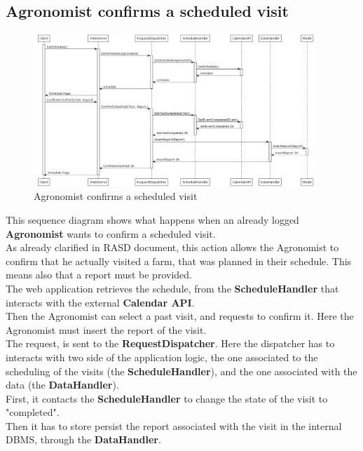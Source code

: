 \documentclass[10pt]{report}
\begin{document}
\subsection{Agronomist confirms a scheduled visit}
\begin{figure}[H]
    \centering
    \includegraphics[width=400px]{SequenceDiagram/Agronomist_2_4.png}
    \caption{Agronomist confirms a scheduled visit}
\end{figure}
This sequence diagram shows what happens when an already logged \textbf{Agronomist} wants to confirm a scheduled visit.\\
As already clarified in RASD document, this action allows the Agronomist to confirm that he actually visited a farm, that was planned in their schedule. This means also that a report must be provided.\\

The web application retrieves the schedule, from the \textbf{ScheduleHandler} that interacts with the external \textbf{Calendar API}.\\
Then the Agronomist can select a past visit, and requests to confirm it. Here the Agronomist must insert the report of the visit. \\
The request, is sent to the \textbf{RequestDispatcher}. Here the dispatcher has to interacts with two side of the application logic, the one associated to the scheduling of the visits (the \textbf{ScheduleHandler}), and the one associated with the data (the \textbf{DataHandler}).\\
First, it contacts the \textbf{ScheduleHandler} to change the state of the visit to "completed".\\
Then it has to store persist the report associated with the visit in the internal DBMS, through the \textbf{DataHandler}.
\end{document}
